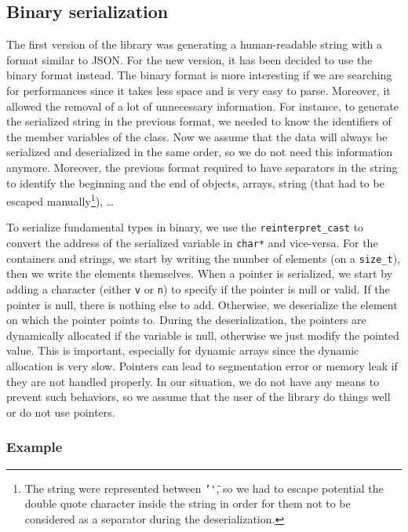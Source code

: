 \subsection{Binary serialization}

The first version of the library was generating a human-readable string with a
format similar to JSON. For the new version, it has been decided to use the
binary format instead. The binary format is more interesting if we are searching
for performances since it takes less space and is very easy to parse. Moreover,
it allowed the removal of a lot of unnecessary information. For instance, to
generate the serialized string in the previous format, we needed to know the
identifiers of the member variables of the class. Now we assume that the data
will always be serialized and deserialized in the same order, so we do not need
this information anymore. Moreover, the previous format required to have
separators in the string to identify the beginning and the end of objects,
arrays, string (that had to be escaped manually\footnote{The string were
represented between \texttt{'\"'}, so we had to escape potential the double
quote character inside the string in order for them not to be considered as a
separator during the deserialization.}), \dots

To serialize fundamental types in binary, we use the \texttt{reinterpret\_cast}
to convert the address of the serialized variable in \texttt{char*} and
vice-versa. For the containers and strings, we start by writing the number of
elements (on a \texttt{size\_t}), then we write the elements themselves. When a
pointer is serialized, we start by adding a character (either \texttt{v} or
\texttt{n}) to specify if the pointer is null or valid. If the pointer is null,
there is nothing else to add. Otherwise, we deserialize the element on which the
pointer points to. During the deserialization, the pointers are dynamically
allocated if the variable is null, otherwise we just modify the pointed value.
This is important, especially for dynamic arrays since the dynamic allocation is
very slow. Pointers can lead to segmentation error or memory leak if they are
not handled properly. In our situation, we do not have any means to prevent such
behaviors, so we assume that the user of the library do things well or do not
use pointers.

\subsubsection{Example}

